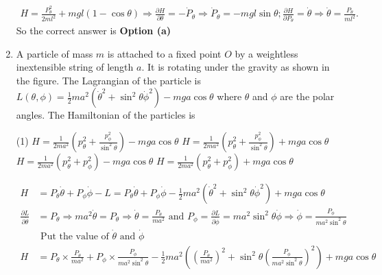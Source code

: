 \begin{enumerate}
\begin{answer}
\begin{align*}
	H=\frac{P_{\theta}^{2}}{2 m l^{2}}+m g l(1-\cos \theta) \Rightarrow \frac{\partial H}{\partial \theta}=-\dot{P}_{\theta} \Rightarrow \dot{P}_{\theta}=-m g l \sin \theta ; \frac{\partial H}{\partial P_{\theta}}=\dot{\theta} \Rightarrow \dot{\theta}=\frac{P_{\theta}}{m l^{2}} .
	\end{align*}
		So the correct answer is \textbf{Option (a)}
\end{answer}
	\item  A particle of mass $m$ is attached to a fixed point $O$ by a weightless inextensible string of length $a$. It is rotating under the gravity as shown in the figure. The Lagrangian of the particle is
	$L(\theta, \phi)=\frac{1}{2} m a^{2}\left(\dot{\theta}^{2}+\sin ^{2} \theta \dot{\phi}^{2}\right)-m g a \cos \theta$ where $\theta$ and $\phi$ are the polar angles. The Hamiltonian of the particles is
	{}
	\begin{tasks}(1)
		\task[\textbf{a.}]$H=\frac{1}{2 m a^{2}}\left(p_{\theta}^{2}+\frac{p_{\phi}^{2}}{\sin ^{2} \theta}\right)-m g a \cos \theta$
		\task[\textbf{b.}]$H=\frac{1}{2 m a^{2}}\left(p_{\theta}^{2}+\frac{p_{\phi}^{2}}{\sin ^{2} \theta}\right)+m g a \cos \theta$
		\task[\textbf{c.}]$H=\frac{1}{2 m a^{2}}\left(p_{\theta}^{2}+p_{\phi}^{2}\right)-m g a \cos \theta$
		\task[\textbf{d.}] $H=\frac{1}{2 m a^{2}}\left(p_{\theta}^{2}+p_{\phi}^{2}\right)+m g a \cos \theta$
	\end{tasks}
\begin{answer}
	\begin{align*}
	H&=P_{\theta} \dot{\theta}+P_{\phi} \dot{\phi}-L=P_{\theta} \dot{\theta}+P_{\phi} \dot{\phi}-\frac{1}{2} m a^{2}\left(\dot{\theta}^{2}+\sin ^{2} \theta \dot{\phi}^{2}\right)+m g a \cos \theta\\
	\frac{\partial L}{\partial \dot{\theta}}&=P_{\theta} \Rightarrow m a^{2} \dot{\theta}=P_{\theta} \Rightarrow \dot{\theta}=\frac{P_{\theta}}{m a^{2}} \text { and } P_{\phi}=\frac{\partial L}{\partial \dot{\phi}}=m a^{2} \sin ^{2} \theta \dot{\phi} \Rightarrow \dot{\phi}=\frac{P_{\phi}}{m a^{2} \sin ^{2} \theta}\\
	&\text { Put the value of }\dot{\theta} \text { and } \dot{\phi}\\
	H&=P_{\theta} \times \frac{P_{\theta}}{m a^{2}}+P_{\phi} \times \frac{P_{\phi}}{m a^{2} \sin ^{2} \theta}-\frac{1}{2} m a^{2}\left(\left(\frac{P_{\theta}}{m a^{2}}\right)^{2}+\sin ^{2} \theta\left(\frac{P_{\phi}}{m a^{2} \sin ^{2} \theta}\right)^{2}\right)+m g a \cos \theta \\

\end{align*}
\end{answer}
\end{enumerate}
